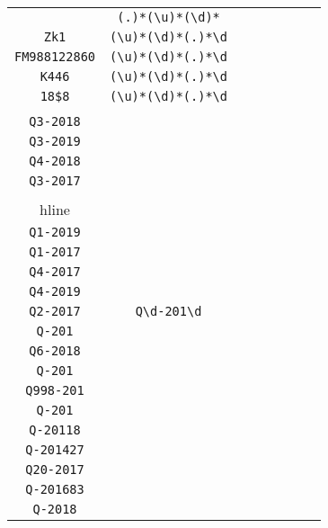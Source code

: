 \begin{longtable}{cccccccc}
\begin{tabular}{ll}
    \verb|| & \verb|(.)*(\u)*(\d)*|\\
\verb|Zk1| & \verb|(\u)*(\d)*(.)*\d|\\
\verb|FM988122860| & \verb|(\u)*(\d)*(.)*\d|\\
\verb|K446| & \verb|(\u)*(\d)*(.)*\d|\\
\verb|18$8| & \verb|(\u)*(\d)*(.)*\d|
\end{tabular}
\\\midrule 
\begin{tabular}{l}
    \verb|Q2-2019|\\
\verb|Q3-2018|\\
\verb|Q3-2019|\\
\verb|Q4-2018|\\
\verb|Q3-2017|\\
\\hline\\
\verb|Q1-2019|\\
\verb|Q1-2017|\\
\verb|Q4-2017|\\
\verb|Q4-2019|\\
\verb|Q2-2017|
\end{tabular}

&
\verb|Q\d-201\d|
&

\begin{tabular}{l}
    \verb|Q(\d)*-201(\d)*|\\
\verb|Q-201|\\
\verb|Q6-2018|\\
\verb|Q-201|\\
\verb|Q998-201|\\
\verb|Q-201|
\end{tabular}

&

\begin{tabular}{l}
    \verb|Q(\d)*-201(\d)*\d|\\
\verb|Q-20118|\\
\verb|Q-201427|\\
\verb|Q20-2017|\\
\verb|Q-201683|\\
\verb|Q-2018|
\end{tabular}

&


\end{longtable}
